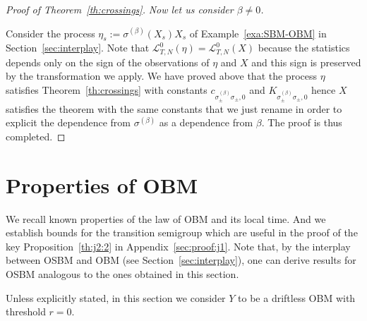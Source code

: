\documentclass[12pt]{article}
\numberwithin{equation}{section}
\theoremstyle{definition}
\theoremstyle{remark}
\begin{document}
\begin{proof}[Proof of Theorem~\ref{th:crossings}]
{\it Now let us consider $\beta\neq 0$.}


Consider the process $\eta_s:=\sigma^{(\beta)}(X_s) X_s$ of Example~\ref{exa:SBM-OBM} in Section~\ref{sec:interplay}.
Note that 
$\mathcal{L}^0_{T,N}(\eta) =\mathcal{L}^0_{T,N}(X)$ because the statistics depends only on the sign of the observations of $\eta$ and $X$ and this sign is preserved by the transformation we apply.
%
We have proved above that the process $\eta$ satisfies Theorem~\ref{th:crossings} with constants $c_{\sigma^{(\beta)}_\pm \sigma_\pm,0}$ and $K_{\sigma^{(\beta)}_\pm \sigma_\pm,0}$
hence
$X$ satisfies the theorem with the same constants that we just rename in order to explicit the dependence from $\sigma^{(\beta)}$ as a dependence from $\beta$.
The proof is thus completed.
\end{proof}



\appendix



\section{Properties of OBM} \label{sec:OBM:basic}

We recall known properties of the law of OBM and its local time.
And we establish bounds for the transition semigroup which are useful in the proof of the key Proposition~\ref{th:j2:2} in Appendix~\ref{sec:proof:j1}.
Note that, by the interplay between OSBM and OBM (see Section~\ref{sec:interplay}), one can derive results for OSBM analogous to the ones obtained in this section.

Unless explicitly stated, in this section we consider $Y$ to be a driftless OBM with threshold $r=0$.


\end{document}
